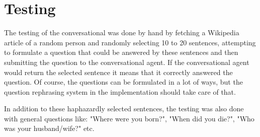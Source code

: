 \section{Testing}
\label{sec:testing}

The testing of the conversational was done by hand by fetching a Wikipedia article of a random person and randomly selecting 10 to 20 sentences, attempting to formulate a question that could be answered by these sentences and then submitting the question to the conversational agent. If the conversational agent would return the selected sentence it means that it correctly answered the question. Of course, the questions can be formulated in a lot of ways, but the question rephrasing system in the implementation should take care of that.

In addition to these haphazardly selected sentences, the testing was also done with general questions like: "Where were you born?", "When did you die?", "Who was your husband/wife?" etc.
